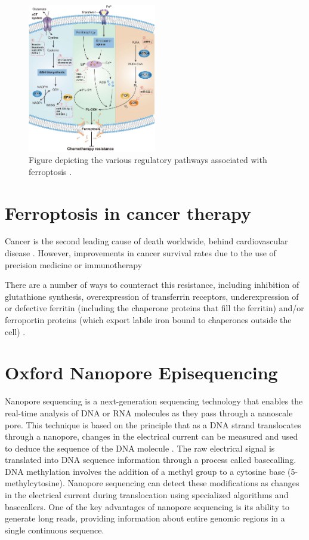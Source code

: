 \begin{figure}[ht]
        \begin{center}
            \includegraphics[width = 0.5\textwidth]{Fig/ferroptosis.png}
        \end{center}
        \caption{Figure depicting the various regulatory pathways associated with ferroptosis \citep{ferro_cancer}.}\label{fig:ferro_mech}
\end{figure}

\section{Ferroptosis in cancer therapy}

Cancer is the second leading cause of death worldwide, behind cardiovascular disease \citep{cancer}. However, improvements in cancer survival rates due to the use of precision medicine or immunotherapy 

There are a number of ways to counteract this resistance, including inhibition of glutathione synthesis, overexpression of transferrin receptors, underexpression of or defective ferritin (including the chaperone proteins that fill the ferritin) and/or ferroportin proteins (which export labile iron bound to chaperones outside the cell) \citep{ferro_drugs}.

\section{Oxford Nanopore Episequencing}

Nanopore sequencing is a next-generation sequencing technology that enables the real-time analysis of DNA or RNA molecules as they pass through a nanoscale pore. This technique is based on the principle that as a DNA strand translocates through a nanopore, changes in the electrical current can be measured and used to deduce the sequence of the DNA molecule \cite{ont}. The raw electrical signal is translated into DNA sequence information through a process called basecalling. DNA methylation involves the addition of a methyl group to a cytosine base (5-methylcytosine). Nanopore sequencing can detect these modifications as changes in the electrical current during translocation using specialized algorithms and basecallers. One of the key advantages of nanopore sequencing is its ability to generate long reads, providing information about entire genomic regions in a single continuous sequence.

